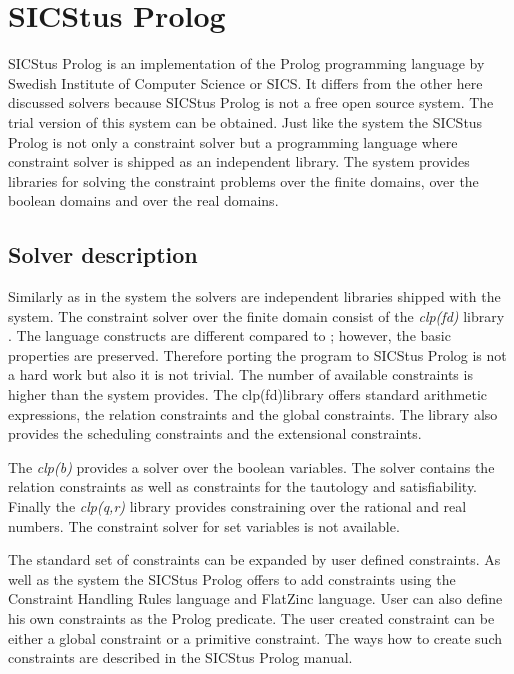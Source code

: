 \section{SICStus Prolog}

SICStus Prolog is an implementation of the Prolog programming language by Swedish
Institute of Computer Science or SICS. It differs from the other here discussed solvers 
because SICStus Prolog is not a free open source system. The trial version of this
system can be obtained. Just like the \eclipse system the SICStus Prolog is not only
a constraint solver but a programming language where constraint solver is shipped as 
an independent library. The system provides libraries for solving the constraint problems
over the finite domains, over the boolean domains and over the real domains.

\subsection{Solver description}
Similarly as in the \eclipse system the solvers are independent libraries shipped 
with the system. The constraint solver over the finite domain consist of the
{\em clp(fd)} library \cite{Carlsson97anopen-ended}. The language constructs are different
compared to \eclipse; however, the basic properties are preserved. Therefore porting
the \eclipse program to SICStus Prolog is not a hard work but also it is not trivial.
The number of available constraints is higher than the \eclipse system provides.
The clp(fd)library offers standard arithmetic expressions, the relation constraints
and the global constraints. The library also provides the scheduling constraints and 
the extensional constraints.

The {\em clp(b)} provides a solver over the boolean variables. The solver contains
the relation constraints as well as constraints for the tautology and satisfiability.
Finally the {\em clp(q,r)} library \cite{clpqr:opai} provides constraining over the 
rational and real numbers. The constraint solver for set variables is not available.

The standard set of constraints can be expanded by user defined constraints. As well as the
\eclipse system the SICStus Prolog offers to add constraints using the Constraint Handling
Rules language and FlatZinc language. User can also define his own constraints as the
Prolog predicate. The user created constraint can be either a global constraint or
a primitive constraint. The ways how to create such constraints are described in 
the SICStus Prolog manual.

